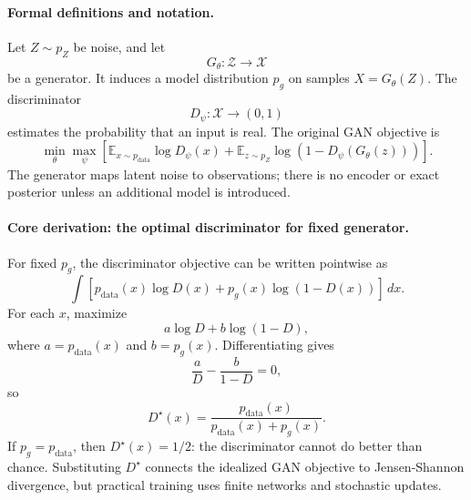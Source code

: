 \paragraph{Formal definitions and notation.}
Let \(Z\sim p_Z\) be noise, and let
\[
G_\theta:\mathcal Z\to\mathcal X
\]
be a generator. It induces a model distribution \(p_g\) on samples \(X=G_\theta(Z)\). The discriminator
\[
D_\psi:\mathcal X\to(0,1)
\]
estimates the probability that an input is real. The original GAN objective is
\[
\boxed{
\min_\theta\max_\psi
\left[
\mathbb{E}_{x\sim p_{\mathrm{data}}}\log D_\psi(x)
+
\mathbb{E}_{z\sim p_Z}\log(1-D_\psi(G_\theta(z)))
\right].
}
\]
The generator maps latent noise to observations; there is no encoder or exact posterior unless an additional model is introduced.

\paragraph{Core derivation: the optimal discriminator for fixed generator.}
For fixed \(p_g\), the discriminator objective can be written pointwise as
\[
\int \left[p_{\mathrm{data}}(x)\log D(x)+p_g(x)\log(1-D(x))\right]\,dx.
\]
For each \(x\), maximize
\[
a\log D+b\log(1-D),
\]
where \(a=p_{\mathrm{data}}(x)\) and \(b=p_g(x)\). Differentiating gives
\[
\frac{a}{D}-\frac{b}{1-D}=0,
\]
so
\[
\boxed{
D^\star(x)=\frac{p_{\mathrm{data}}(x)}
{p_{\mathrm{data}}(x)+p_g(x)}.
}
\]
If \(p_g=p_{\mathrm{data}}\), then \(D^\star(x)=1/2\): the discriminator cannot do better than chance. Substituting \(D^\star\) connects the idealized GAN objective to Jensen-Shannon divergence, but practical training uses finite networks and stochastic updates.

